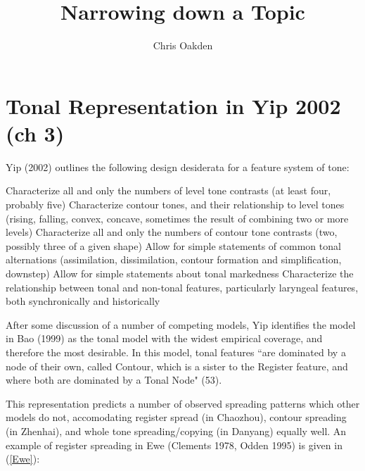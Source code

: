 \documentclass{article}
\title{Narrowing down a Topic}
\author{Chris Oakden}
\begin{document}
\maketitle
\section{Tonal Representation in Yip 2002 (ch 3)}
Yip (2002) outlines the following design desiderata for a feature system of tone:
\begin{exe}
\ex
\begin{xlist}
	\ex Characterize all and only the numbers of level tone contrasts (at least four, probably five)
	\ex Characterize contour tones, and their relationship to level tones (rising, falling, convex, concave, sometimes the result of combining two or more levels)
	\ex Characterize all and only the numbers of contour tone contrasts (two, possibly three of a given shape)
	\ex Allow for simple statements of common tonal alternations (assimilation, dissimilation, contour formation and simplification, downstep) 
	\ex Allow for simple statements about tonal markedness
	\ex Characterize the relationship between tonal and non-tonal features, particularly laryngeal features, both synchronically and historically
\end{xlist}
\end{exe}
After some discussion of a number of competing models, Yip identifies the model in Bao (1999) as the tonal model with the widest empirical coverage, and therefore the most desirable. In this model, tonal features ``are dominated by a node of their own, called Contour, which is a sister to the Register feature, and where both are dominated by a Tonal Node" (53).
\begin{exe}
\ex
{}
\end{exe}
This representation predicts a number of observed spreading patterns which other models do not, accomodating register spread (in Chaozhou), contour spreading (in Zhenhai), and whole tone spreading/copying (in Danyang) equally well. An example of register spreading in Ewe (Clements 1978, Odden 1995) is given in (\ref{Ewe}):
\begin{exe}
\ex \label{Ewe}
\end{exe}
\end{document}
